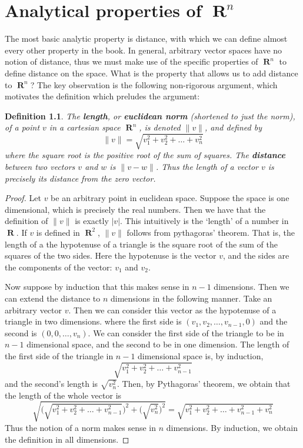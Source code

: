 \documentclass{report}
\newtheorem{definition}{Definition}
\DeclareMathOperator{\real}{\mathbf{R}}
\begin{document}
\chapter{Analytical properties of $\real^n$}

The most basic analytic property is distance, with which we can define almost every other property in the book. In general, arbitrary vector spaces have no notion of distance, thus we must make use of the specific properties of $\real^n$ to define distance on the space. What is the property that allows us to add distance to $\real^n$? The key observation is the following non-rigorous argument, which motivates the definition which preludes the argument:

\begin{definition}
  The {\bf length}, or {\bf euclidean norm} (shortened to just the norm), of a point $v$ in a cartesian space $\real^n$, is denoted $\|v\|$, and defined by
  \[ \| v \| = \sqrt{v_1^2 + v_2^2 + \dots + v_n^2} \]
  where the square root is the positive root of the sum of squares. The {\bf distance} between two vectors $v$ and $w$ is $\| v - w \|$. Thus the length of a vector $v$ is precisely its distance from the zero vector.
\end{definition}
\begin{proof}
  Let $v$ be an arbitrary point in euclidean space. Suppose the space is one dimensional, which is precisely the real numbers. Then we have that the definition of $\|v\|$ is exactly $|v|$. This intuitively is the `length' of a number in $\real$. If $v$ is defined in $\real^2$, $\|v\|$ follows from pythagoras' theorem. That is, the length of a the hypotenuse of a triangle is the square root of the sum of the squares of the two sides. Here the hypotenuse is the vector $v$, and the sides are the components of the vector: $v_1$ and $v_2$.

  Now suppose by induction that this makes sense in $n-1$ dimensions. Then we can extend the distance to $n$ dimensions in the following manner. Take an arbitrary vector $v$. Then we can consider this vector as the hypotenuse of a triangle in two dimensions. where the first side is $(v_1,v_2,\dots,v_{n-1},0)$ and the second is $(0,0,\dots,v_n)$. We can consider the first side of the triangle to be in $n-1$ dimensional space, and the second to be in one dimension. The length of the first side of the triangle in $n-1$ dimensional space is, by induction,
  \[ \sqrt{v_1^2 + v_2^2 + \dots + v_{n-1}^2} \]
  and the second's length is $\sqrt{v_n^2}$. Then, by Pythagoras' theorem, we obtain that the length of the whole vector is
  \[ \sqrt{\bigg(\sqrt{v_1^2 + v_2^2 + \dots + v_{n-1}^2}\bigg)^2 + \bigg(\sqrt{v_n^2}\bigg)^2}
        = \sqrt{v_1^2 + v_2^2 + \dots + v_{n-1}^2 + v_n^2} \]
  Thus the notion of a norm makes sense in $n$ dimensions. By induction, we obtain the definition in all dimensions.
\end{proof}
\end{document}
